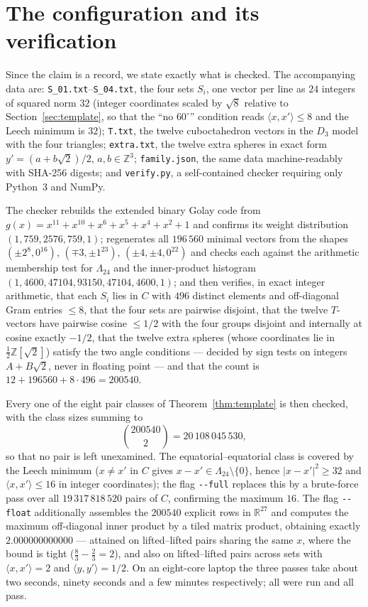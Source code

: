 \documentclass[11pt,reqno]{amsart}
\theoremstyle{plain}
\theoremstyle{remark}
\newcommand{\R}{\mathbb{R}}
\newcommand{\Z}{\mathbb{Z}}
\newcommand{\Lat}{\Lambda_{24}}
\newcommand{\ip}[2]{\langle #1, #2\rangle}
\begin{document}
\section{The configuration and its verification}\label{sec:verification}

Since the claim is a record, we state exactly what is checked.  The accompanying
data are: \texttt{S\_01.txt}--\texttt{S\_04.txt}, the four sets $S_{i}$, one vector
per line as $24$ integers of squared norm $32$ (integer coordinates scaled by
$\sqrt8$ relative to Section~\ref{sec:template}, so that the ``no $60^{\circ}$''
condition reads $\ip{x}{x'} \le 8$ and the Leech minimum is $32$);
\texttt{T.txt}, the twelve cuboctahedron vectors in the $D_{3}$ model with the
four triangles; \texttt{extra.txt}, the twelve extra spheres in exact form
$y' = (a + b\sqrt2)/2$, $a,b \in \Z^{3}$; \texttt{family.json}, the same data
machine-readably with SHA-256 digests; and \texttt{verify.py}, a self-contained
checker requiring only Python~3 and NumPy.

The checker rebuilds the extended binary Golay code from
$g(x) = x^{11}+x^{10}+x^{6}+x^{5}+x^{4}+x^{2}+1$ and confirms its weight
distribution $(1,759,2576,759,1)$; regenerates all $196\,560$ minimal vectors from
the shapes $(\pm2^{8},0^{16})$, $(\mp3,\pm1^{23})$, $(\pm4,\pm4,0^{22})$ and checks
each against the arithmetic membership test for $\Lat$ and the inner-product
histogram $(1,4600,47104,93150,47104,4600,1)$; and then verifies, in exact integer
arithmetic, that each $S_{i}$ lies in $C$ with $496$ distinct elements and
off-diagonal Gram entries $\le 8$, that the four sets are pairwise disjoint, that
the twelve $T$-vectors have pairwise cosine $\le 1/2$ with the four groups
disjoint and internally at cosine exactly $-1/2$, that the twelve extra spheres
(whose coordinates lie in $\tfrac12\Z[\sqrt2]$) satisfy the two angle conditions
--- decided by sign tests on integers $A + B\sqrt2$, never in floating point ---
and that the count is $12 + 196560 + 8\cdot496 = 200540$.

Every one of the eight pair classes of Theorem~\ref{thm:template} is then checked,
with the class sizes summing to
\[
  \binom{200540}{2} = 20\,108\,045\,530,
\]
so that no pair is left unexamined.  The equatorial--equatorial class is covered
by the Leech minimum ($x \ne x'$ in $C$ gives $x-x' \in \Lat\setminus\{0\}$, hence
$|x-x'|^{2} \ge 32$ and $\ip{x}{x'} \le 16$ in integer coordinates); the flag
\texttt{-{}-full} replaces this by a brute-force pass over all
$19\,317\,818\,520$ pairs of $C$, confirming the maximum $16$.  The flag
\texttt{-{}-float} additionally assembles the $200540$ explicit rows in $\R^{27}$
and computes the maximum off-diagonal inner product by a tiled matrix product,
obtaining exactly $2.000000000000$ --- attained on lifted--lifted pairs sharing
the same $x$, where the bound is tight ($\tfrac83 - \tfrac23 = 2$), and also on
lifted--lifted pairs across sets with $\ip{x}{x'} = 2$ and $\ip{y}{y'} = 1/2$.  On
an eight-core laptop the three passes take about two seconds, ninety seconds and a
few minutes respectively; all were run and all pass.
\end{document}
